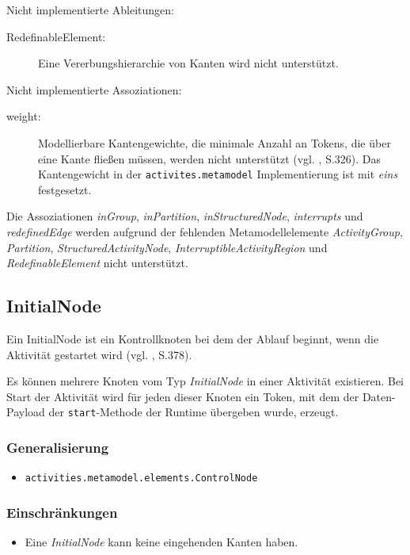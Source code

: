 Nicht implementierte Ableitungen:
\begin{description}
\item[RedefinableElement:] Eine Vererbungshierarchie von Kanten wird nicht unterstützt.
\end{description}

Nicht implementierte Assoziationen:
\begin{description}
\item[weight:] Modellierbare Kantengewichte, die minimale Anzahl an Tokens, die über eine Kante fließen müssen, werden nicht unterstützt (vgl. \citep{OMG2009}, S.326). Das Kantengewicht in der \texttt{activites.metamodel} Implementierung ist mit \emph{eins} festgesetzt.
\end{description}
Die Assoziationen \emph{inGroup}, \emph{inPartition}, \emph{inStructuredNode}, \emph{interrupts} und \emph{redefinedEdge} werden aufgrund der fehlenden Metamodellelemente \emph{ActivityGroup}, \emph{Partition}, \emph{StructuredActivityNode}, \emph{InterruptibleActivityRegion} und \emph{RedefinableElement} nicht unterstützt.


\subsection{InitialNode}
\label{meta-initial}
Ein InitialNode ist ein Kontrollknoten bei dem der Ablauf beginnt, wenn die Aktivität gestartet wird (vgl. \citep{OMG2009}, S.378).

Es können mehrere Knoten vom Typ \emph{InitialNode} in einer Aktivität existieren. Bei Start der Aktivität wird für jeden dieser Knoten ein Token, mit dem der Daten-Payload der \texttt{start}-Methode der Runtime übergeben wurde, erzeugt.

\subsubsection{Generalisierung}
\begin{itemize}
\item \texttt{activities.metamodel.elements.ControlNode}
\end{itemize}

\subsubsection{Einschränkungen}
\begin{itemize}
\item Eine \emph{InitialNode} kann keine eingehenden Kanten haben.
\end{itemize}


